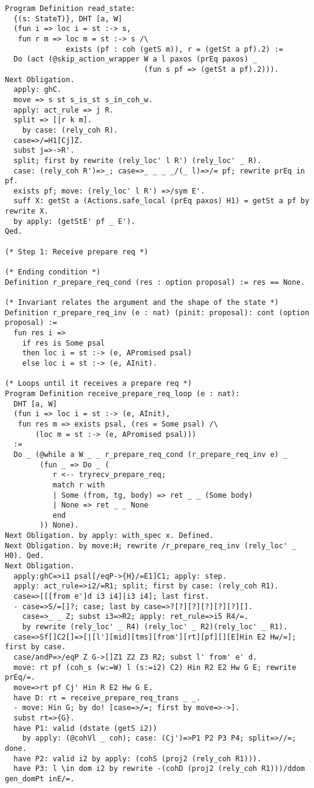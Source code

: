 \begin{landscape}
\begin{multicols*}{2}
\begin{lstlisting}[style=SourceCodeListing]
Program Definition read_state:
  {(s: StateT)}, DHT [a, W]
  (fun i => loc i = st :-> s,
   fun r m => loc m = st :-> s /\
              exists (pf : coh (getS m)), r = (getSt a pf).2) :=
  Do (act (@skip_action_wrapper W a l paxos (prEq paxos) _
                                (fun s pf => (getSt a pf).2))).
Next Obligation.
  apply: ghC.
  move => s st s_is_st s_in_coh_w.
  apply: act_rule => j R.
  split => [|r k m].
    by case: (rely_coh R).
  case=>/=H1[Cj]Z.
  subst j=>->R'.
  split; first by rewrite (rely_loc' l R') (rely_loc' _ R).
  case: (rely_coh R')=>_; case=>_ _ _ _/(_ l)=>/= pf; rewrite prEq in pf.
  exists pf; move: (rely_loc' l R') =>/sym E'.
  suff X: getSt a (Actions.safe_local (prEq paxos) H1) = getSt a pf by rewrite X.
  by apply: (getStE' pf _ E').
Qed.

(* Step 1: Receive prepare req *)

(* Ending condition *)
Definition r_prepare_req_cond (res : option proposal) := res == None.

(* Invariant relates the argument and the shape of the state *)
Definition r_prepare_req_inv (e : nat) (pinit: proposal): cont (option proposal) :=
  fun res i =>
    if res is Some psal
    then loc i = st :-> (e, APromised psal)
    else loc i = st :-> (e, AInit).

(* Loops until it receives a prepare req *)
Program Definition receive_prepare_req_loop (e : nat):
  DHT [a, W]
  (fun i => loc i = st :-> (e, AInit),
   fun res m => exists psal, (res = Some psal) /\
       (loc m = st :-> (e, APromised psal)))
  :=
  Do _ (@while a W _ _ r_prepare_req_cond (r_prepare_req_inv e) _
        (fun _ => Do _ (
           r <-- tryrecv_prepare_req;
           match r with
           | Some (from, tg, body) => ret _ _ (Some body)
           | None => ret _ _ None
           end
        )) None).
Next Obligation. by apply: with_spec x. Defined.
Next Obligation. by move:H; rewrite /r_prepare_req_inv (rely_loc' _ H0). Qed.
Next Obligation.
  apply:ghC=>i1 psal[/eqP->{H}/=E1]C1; apply: step.
  apply: act_rule=>i2/=R1; split; first by case: (rely_coh R1).
  case=>[[[from e']d i3 i4]|i3 i4]; last first.
  - case=>S/=[]?; case; last by case=>?[?][?][?][?][?][].
    case=>_ _ Z; subst i3=>R2; apply: ret_rule=>i5 R4/=.
    by rewrite (rely_loc' _ R4) (rely_loc' _ R2)(rely_loc' _ R1).
  case=>Sf[]C2[]=>[|[l'][mid][tms][from'][rt][pf][][E]Hin E2 Hw/=]; first by case.
  case/andP=>/eqP Z G->[]Z1 Z2 Z3 R2; subst l' from' e' d.
  move: rt pf (coh_s (w:=W) l (s:=i2) C2) Hin R2 E2 Hw G E; rewrite prEq/=.
  move=>rt pf Cj' Hin R E2 Hw G E.
  have D: rt = receive_prepare_req_trans _ _.
  - move: Hin G; by do! [case=>/=; first by move=>->].
  subst rt=>{G}.
  have P1: valid (dstate (getS i2))
    by apply: (@cohVl _ coh); case: (Cj')=>P1 P2 P3 P4; split=>//=; done.
  have P2: valid i2 by apply: (cohS (proj2 (rely_coh R1))).
  have P3: l \in dom i2 by rewrite -(cohD (proj2 (rely_coh R1)))/ddom gen_domPt inE/=.


\end{lstlisting}
\end{multicols*}
\end{landscape}
